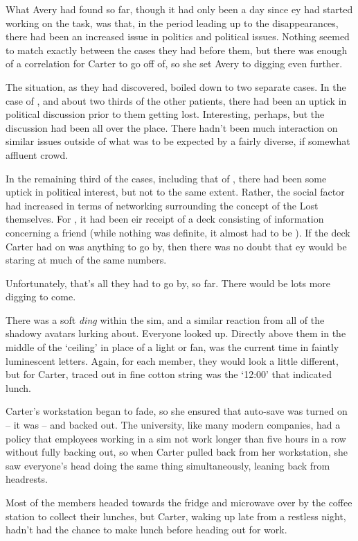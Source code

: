 What Avery had found so far, though it had only been a day since ey had started working on the task, was that, in the period leading up to the disappearances, there had been an increased issue in politics and political issues.  Nothing seemed to match exactly between the cases they had before them, but there was enough of a correlation for Carter to go off of, so she set Avery to digging even further.

The situation, as they had discovered, boiled down to two separate cases.  In the case of \ptCollin, and about two thirds of the other patients, there had been an uptick in political discussion prior to them getting lost.  Interesting, perhaps, but the discussion had been all over the place.  There hadn't been much interaction on similar issues outside of what was to be expected by a fairly diverse, if somewhat affluent crowd.

In the remaining third of the cases, including that of \ptRJ, there had been some uptick in political interest, but not to the same extent.  Rather, the social factor had increased in terms of networking surrounding the concept of the Lost themselves.  For \ptRJ, it had been eir receipt of a deck consisting of information concerning a friend (while nothing was definite, it almost had to be \ptCollin).  If the deck Carter had on \ptCollin was anything to go by, then there was no doubt that ey would be staring at much of the same numbers.

Unfortunately, that's all they had to go by, so far.  There would be lots more digging to come.

There was a soft \textit{ding} within the sim, and a similar reaction from all of the shadowy avatars lurking about.  Everyone looked up.  Directly above them in the middle of the `ceiling' in place of a light or fan, was the current time in faintly luminescent letters.  Again, for each member, they would look a little different, but for Carter, traced out in fine cotton string was the `12:00' that indicated lunch.

Carter's workstation began to fade, so she ensured that auto-save was turned on -- it was -- and backed out.  The university, like many modern companies, had a policy that employees working in a sim not work longer than five hours in a row without fully backing out, so when Carter pulled back from her workstation, she saw everyone's head doing the same thing simultaneously, leaning back from headrests.

Most of the members headed towards the fridge and microwave over by the coffee station to collect their lunches, but Carter, waking up late from a restless night, hadn't had the chance to make lunch before heading out for work.

